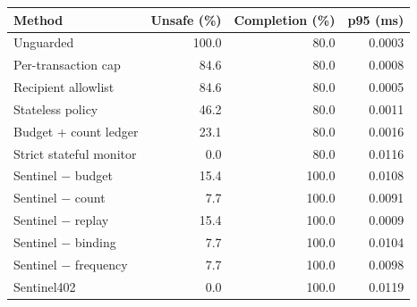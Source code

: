 \begin{tabular}{lrrr}
\hline
Method & Unsafe (\%) & Completion (\%) & p95 (ms) \\
\hline
Unguarded & 100.0 & 80.0 & 0.0003 \\
Per-transaction cap & 84.6 & 80.0 & 0.0008 \\
Recipient allowlist & 84.6 & 80.0 & 0.0005 \\
Stateless policy & 46.2 & 80.0 & 0.0011 \\
Budget + count ledger & 23.1 & 80.0 & 0.0016 \\
Strict stateful monitor & 0.0 & 80.0 & 0.0116 \\
Sentinel $-$ budget & 15.4 & 100.0 & 0.0108 \\
Sentinel $-$ count & 7.7 & 100.0 & 0.0091 \\
Sentinel $-$ replay & 15.4 & 100.0 & 0.0009 \\
Sentinel $-$ binding & 7.7 & 100.0 & 0.0104 \\
Sentinel $-$ frequency & 7.7 & 100.0 & 0.0098 \\
Sentinel402 & 0.0 & 100.0 & 0.0119 \\
\hline
\end{tabular}
